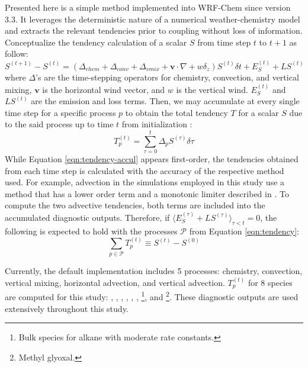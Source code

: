 	Presented here is a simple method implemented into WRF-Chem since version 3.3. It leverages the deterministic nature of a numerical weather-chemistry model and extracts the relevant tendencies prior to coupling without loss of information. Conceptualize the tendency calculation of a scalar $S$ from time step $t$ to $t+1$ as follow:
	\begin{equation}\label{eqn:tendency}
		S^{(t+1)}-S^{(t)} = (\Delta_{chem}+\Delta_{conv}+\Delta_{vmix}+\mathbf{v}\cdot\nabla + w\delta_z)S^{(t)}\delta t + E_S^{(t)} + LS^{(t)}
	\end{equation}
	where $\Delta$'s are the time-stepping operators for chemistry, convection, and vertical mixing, $\mathbf{v}$ is the horizontal wind vector, and $w$ is the vertical wind. $E_S^{(t)}$ and $LS^{(t)}$ are the emission and loss terms. Then, we may accumulate at every single time step for a specific process $p$ to obtain the total tendency $T$ for a scalar $S$ due to the said process up to time $t$ from initialization :
	\begin{equation}\label{eqn:tendency-accul}
		T_{p}^{(t)} = \sum_{\tau=0}^t\Delta_{p} S^{(\tau)}\delta\tau
	\end{equation}
	While Equation \ref{eqn:tendency-accul} appears first-order, the tendencies obtained from each time step is calculated with the accuracy of the respective method used. For example, advection in the simulations employed in this study use a method that has a lower order term and a monotonic limiter described in \citet{Skamarock:2006wm}. To compute the two advective tendencies, both terms are included into the accumulated diagnostic outputs. Therefore,  if $\langle E_S^{(\tau)}+LS^{(\tau)}\rangle_{\tau<t}=0$, the following is expected to hold with the processes $\mathcal{P}$ from Equation \ref{eqn:tendency}:
	\begin{equation}\label{eqn:tendency-good}
		\sum_{p\in\mathcal{P}}T_{p}^{(t)} \equiv S^{(t)}-S^{(0)}
	\end{equation}
	
	Currently, the default implementation includes 5 processes: chemistry, convection, vertical mixing, horizontal advection, and vertical advection. $T_{p}^{(t)}$ for 8 species are computed for this study: , , , , , , \footnote{Bulk species for alkane with moderate  rate constants.}, and \footnote{Methyl glyoxal.}. These diagnostic outputs are used extensively throughout this study.
	
